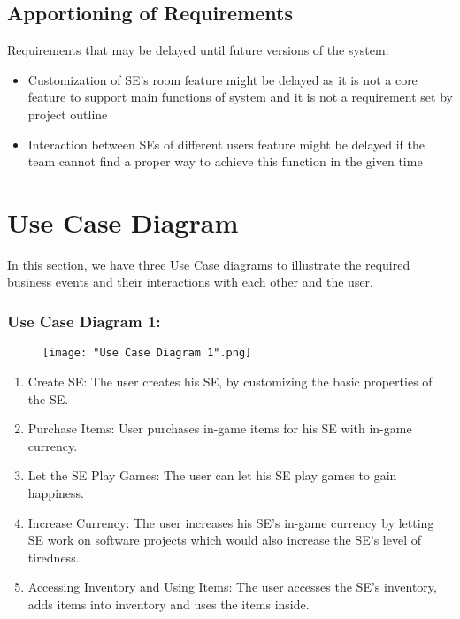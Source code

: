 \documentclass[]{article}
\begin{document}
\subsection{Apportioning of Requirements}
\label{sub:apportioning_of_requirements}
Requirements that may be delayed until future versions of the system:

\begin{itemize}
    \item Customization of SE’s room feature might be delayed as it is not a 
    core feature to support main functions of system and it is not a requirement 
    set by project outline
    \item Interaction between SEs of different users feature might be delayed 
    if the team cannot find a proper way to achieve this function in the given 
    time
\end{itemize}

\section{Use Case Diagram}
\label{sec:use_case_diagram}
In this section, we have three Use Case diagrams to illustrate the required 
business events and their interactions with each other and the user.

\subsubsection*{Use Case Diagram 1:}
\begin{figure}[H]
    \centering
    \texttt{[image: "Use Case Diagram 1".png]}
\end{figure}

\begin{enumerate}
    \item Create SE: The user creates his SE, by customizing the basic 
    properties of the SE.
    \item Purchase Items: User purchases in-game items for his SE with in-game 
    currency.
    \item Let the SE Play Games: The user can let his SE play games to gain 
    happiness.
    \item Increase Currency: The user increases his SE’s in-game currency by 
    letting SE work on software projects which would also increase the SE’s 
    level of tiredness.
    \item Accessing Inventory and Using Items: The user accesses the SE’s 
    inventory, adds items into inventory and uses the items inside.
\end{enumerate}
\end{document}

